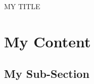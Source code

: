 \documentclass{article}
\begin{document}
\def\drawingtitle{MY TITLE}

\begin{titlepage}

\vspace*{\fill}
	\huge \centering \drawingtitle
\vspace*{\fill}
\end{titlepage}

\tableofcontents
{} 

\newpage
{} 
\section{My Content}
\subsection{My Sub-Section}
	\lipsum[1-10]
\end{document}
